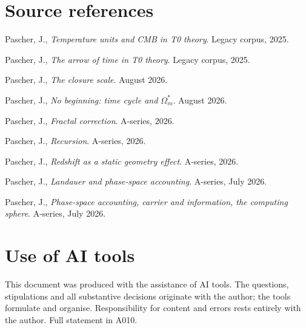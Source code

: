 \section{Source references}

\begin{description}[leftmargin=3.2em,style=sameline,itemsep=0.3em]
\small
\item[{Doc.~061}] Pascher, J., \emph{Temperature units and CMB in T0
theory}. Legacy corpus, 2025.
\item[{Doc.~157}] Pascher, J., \emph{The arrow of time in T0 theory}.
Legacy corpus, 2025.
\item[{Doc.~312}] Pascher, J., \emph{The closure scale}. August 2026.
\item[{Doc.~313}] Pascher, J., \emph{No beginning: time cycle and
$\Omega_m^*$}. August 2026.
\item[{A040}] Pascher, J., \emph{Fractal correction}. A-series, 2026.
\item[{A050}] Pascher, J., \emph{Recursion}. A-series, 2026.
\item[{A265}] Pascher, J., \emph{Redshift as a static geometry effect}.
A-series, 2026.
\item[{A271}] Pascher, J., \emph{Landauer and phase-space accounting}.
A-series, July 2026.
\item[{A280--A282}] Pascher, J., \emph{Phase-space accounting, carrier
and information, the computing sphere}. A-series, July 2026.
\end{description}

\section{Use of AI tools}

This document was produced with the assistance of AI tools.
The questions, stipulations and all substantive decisions originate
with the author; the tools formulate and organise.
Responsibility for content and errors rests entirely with the author.
Full statement in A010.
